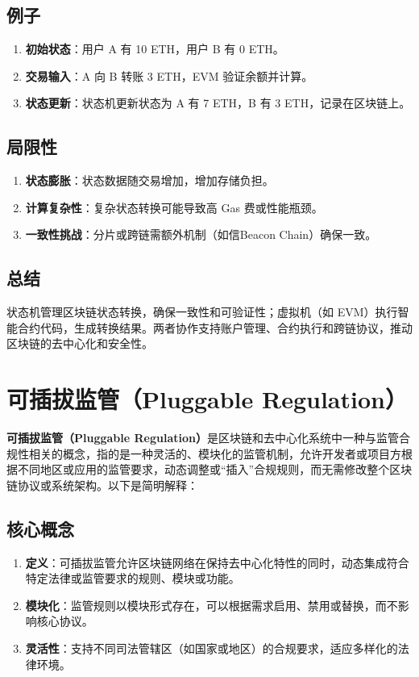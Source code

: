 \documentclass[12pt]{ctexart}
\begin{document}
\subsection{例子}
\begin{enumerate}
    \item \textbf{初始状态}：用户 A 有 10 ETH，用户 B 有 0 ETH。
    \item \textbf{交易输入}：A 向 B 转账 3 ETH，EVM 验证余额并计算。
    \item \textbf{状态更新}：状态机更新状态为 A 有 7 ETH，B 有 3 ETH，记录在区块链上。
\end{enumerate}

\subsection{局限性}
\begin{enumerate}
    \item \textbf{状态膨胀}：状态数据随交易增加，增加存储负担。
    \item \textbf{计算复杂性}：复杂状态转换可能导致高 Gas 费或性能瓶颈。
    \item \textbf{一致性挑战}：分片或跨链需额外机制（如信Beacon Chain）确保一致。
\end{enumerate}

\subsection{总结}
状态机管理区块链状态转换，确保一致性和可验证性；虚拟机（如 EVM）执行智能合约代码，生成转换结果。两者协作支持账户管理、合约执行和跨链协议，推动区块链的去中心化和安全性。

\newpage
\section{可插拔监管（Pluggable Regulation）}
\textbf{可插拔监管（Pluggable Regulation）}是区块链和去中心化系统中一种与监管合规性相关的概念，指的是一种灵活的、模块化的监管机制，允许开发者或项目方根据不同地区或应用的监管要求，动态调整或“插入”合规规则，而无需修改整个区块链协议或系统架构。以下是简明解释：

\subsection{核心概念}
\begin{enumerate}
    \item \textbf{定义}：可插拔监管允许区块链网络在保持去中心化特性的同时，动态集成符合特定法律或监管要求的规则、模块或功能。
    \item \textbf{模块化}：监管规则以模块形式存在，可以根据需求启用、禁用或替换，而不影响核心协议。
    \item \textbf{灵活性}：支持不同司法管辖区（如国家或地区）的合规要求，适应多样化的法律环境。
\end{enumerate}
\end{document}
